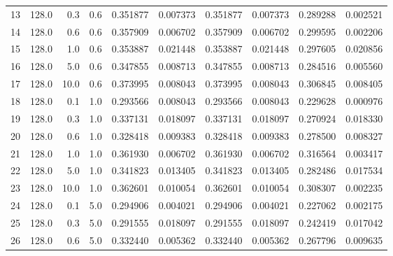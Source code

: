 \begin{tabular}{lrrrrrrrrr}
13 &           128.0 &   0.3 &   0.6 &         0.351877 &        0.007373 &         0.351877 &        0.007373 &         0.289288 &        0.002521 \\
14 &           128.0 &   0.6 &   0.6 &         0.357909 &        0.006702 &         0.357909 &        0.006702 &         0.299595 &        0.002206 \\
15 &           128.0 &   1.0 &   0.6 &         0.353887 &        0.021448 &         0.353887 &        0.021448 &         0.297605 &        0.020856 \\
16 &           128.0 &   5.0 &   0.6 &         0.347855 &        0.008713 &         0.347855 &        0.008713 &         0.284516 &        0.005560 \\
17 &           128.0 &  10.0 &   0.6 &         0.373995 &        0.008043 &         0.373995 &        0.008043 &         0.306845 &        0.008405 \\
18 &           128.0 &   0.1 &   1.0 &         0.293566 &        0.008043 &         0.293566 &        0.008043 &         0.229628 &        0.000976 \\
19 &           128.0 &   0.3 &   1.0 &         0.337131 &        0.018097 &         0.337131 &        0.018097 &         0.270924 &        0.018330 \\
20 &           128.0 &   0.6 &   1.0 &         0.328418 &        0.009383 &         0.328418 &        0.009383 &         0.278500 &        0.008327 \\
21 &           128.0 &   1.0 &   1.0 &         0.361930 &        0.006702 &         0.361930 &        0.006702 &         0.316564 &        0.003417 \\
22 &           128.0 &   5.0 &   1.0 &         0.341823 &        0.013405 &         0.341823 &        0.013405 &         0.282486 &        0.017534 \\
23 &           128.0 &  10.0 &   1.0 &         0.362601 &        0.010054 &         0.362601 &        0.010054 &         0.308307 &        0.002235 \\
24 &           128.0 &   0.1 &   5.0 &         0.294906 &        0.004021 &         0.294906 &        0.004021 &         0.227062 &        0.002175 \\
25 &           128.0 &   0.3 &   5.0 &         0.291555 &        0.018097 &         0.291555 &        0.018097 &         0.242419 &        0.017042 \\
26 &           128.0 &   0.6 &   5.0 &         0.332440 &        0.005362 &         0.332440 &        0.005362 &         0.267796 &        0.009635 \\

\end{tabular}
